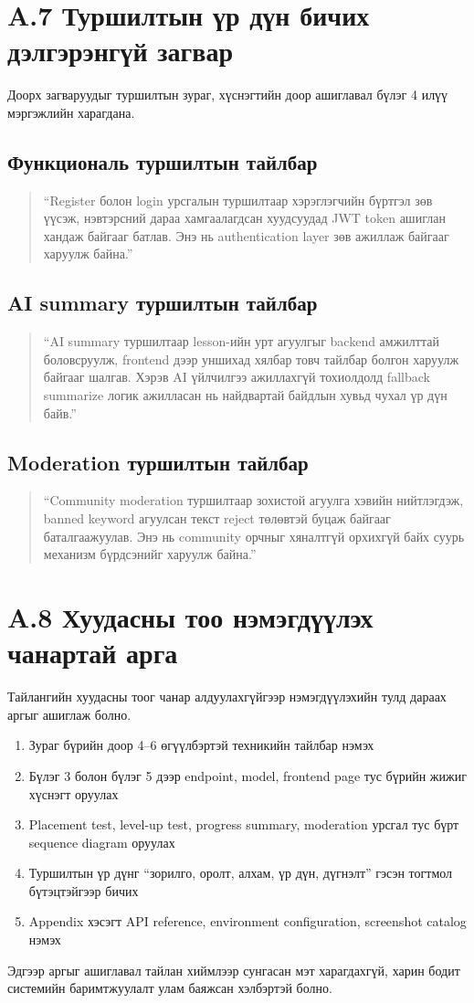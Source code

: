 \section*{A.7 Туршилтын үр дүн бичих дэлгэрэнгүй загвар}
Доорх загваруудыг туршилтын зураг, хүснэгтийн доор ашиглавал бүлэг 4 илүү мэргэжлийн харагдана.

\subsection*{Функциональ туршилтын тайлбар}
\begin{quote}
``Register болон login урсгалын туршилтаар хэрэглэгчийн бүртгэл зөв үүсэж, нэвтэрсний дараа хамгаалагдсан хуудсуудад JWT token ашиглан хандаж байгааг батлав. Энэ нь authentication layer зөв ажиллаж байгааг харуулж байна.''
\end{quote}

\subsection*{AI summary туршилтын тайлбар}
\begin{quote}
``AI summary туршилтаар lesson-ийн урт агуулгыг backend амжилттай боловсруулж, frontend дээр уншихад хялбар товч тайлбар болгон харуулж байгааг шалгав. Хэрэв AI үйлчилгээ ажиллахгүй тохиолдолд fallback summarize логик ажилласан нь найдвартай байдлын хувьд чухал үр дүн байв.''
\end{quote}

\subsection*{Moderation туршилтын тайлбар}
\begin{quote}
``Community moderation туршилтаар зохистой агуулга хэвийн нийтлэгдэж, banned keyword агуулсан текст reject төлөвтэй буцаж байгааг баталгаажуулав. Энэ нь community орчныг хяналтгүй орхихгүй байх суурь механизм бүрдсэнийг харуулж байна.''
\end{quote}

\section*{A.8 Хуудасны тоо нэмэгдүүлэх чанартай арга}
Тайлангийн хуудасны тоог чанар алдуулахгүйгээр нэмэгдүүлэхийн тулд дараах аргыг ашиглаж болно.
\begin{enumerate}
\item Зураг бүрийн доор 4--6 өгүүлбэртэй техникийн тайлбар нэмэх
\item Бүлэг 3 болон бүлэг 5 дээр endpoint, model, frontend page тус бүрийн жижиг хүснэгт оруулах
\item Placement test, level-up test, progress summary, moderation урсгал тус бүрт sequence diagram оруулах
\item Туршилтын үр дүнг ``зорилго, оролт, алхам, үр дүн, дүгнэлт'' гэсэн тогтмол бүтэцтэйгээр бичих
\item Appendix хэсэгт API reference, environment configuration, screenshot catalog нэмэх
\end{enumerate}

Эдгээр аргыг ашиглавал тайлан хиймлээр сунгасан мэт харагдахгүй, харин бодит системийн баримтжуулалт улам баяжсан хэлбэртэй болно.

